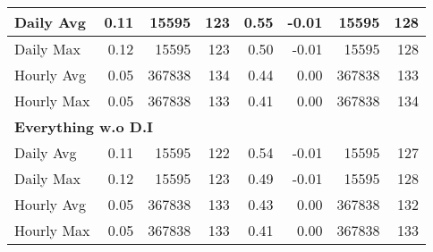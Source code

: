 \begin{tabular}{l|r|r|r|r|r|r|r}
\hline
\hspace{1em}Daily Avg & 0.11 & 15595 & 123 & 0.55 & -0.01 & 15595 & 128\\
\hline
\hspace{1em}Daily Max & 0.12 & 15595 & 123 & 0.50 & -0.01 & 15595 & 128\\
\hline
\hspace{1em}Hourly Avg & 0.05 & 367838 & 134 & 0.44 & 0.00 & 367838 & 133\\
\hline
\hspace{1em}Hourly Max & 0.05 & 367838 & 133 & 0.41 & 0.00 & 367838 & 134\\
\hline
\multicolumn{8}{l}{\textbf{Everything w.o D.I}}\\
\hline
\hspace{1em}Daily Avg & 0.11 & 15595 & 122 & 0.54 & -0.01 & 15595 & 127\\
\hline
\hspace{1em}Daily Max & 0.12 & 15595 & 123 & 0.49 & -0.01 & 15595 & 128\\
\hline
\hspace{1em}Hourly Avg & 0.05 & 367838 & 133 & 0.43 & 0.00 & 367838 & 132\\
\hline
\hspace{1em}Hourly Max & 0.05 & 367838 & 133 & 0.41 & 0.00 & 367838 & 133\\
\hline
\end{tabular}
